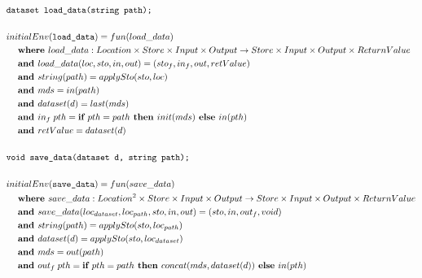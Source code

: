 \documentclass[12pt]{article}
\begin{document}
\begin{align*}
	&\texttt{dataset load\_data(string path);} \\
	\\
&initialEnv(\texttt{load\_data}) = fun(load\_data) \\
&\hspace{3ex}\textbf{where } load\_data:Location\times Store\times Input\times Output\rightarrow Store\times Input\times Output\times ReturnValue \\
&\hspace{3ex}\textbf{and } load\_data(loc,sto,in,out) = (sto_f,in_f,out, retValue)\\
&\hspace{3ex}\textbf{and } string(path) = applySto(sto,loc) \\
&\hspace{3ex}\textbf{and } mds = in(path) \\
&\hspace{3ex}\textbf{and } dataset(d) = last(mds) \\
&\hspace{3ex}\textbf{and } in_f\; pth = \textbf{if } pth = path \textbf{ then } init(mds)\textbf{ else } in(pth) \\
&\hspace{3ex}\textbf{and } retValue = dataset(d)\\
\\
	&\texttt{void save\_data(dataset d, string path);} \\
	\\
&initialEnv(\texttt{save\_data}) = fun(save\_data) \\
&\hspace{3ex}\textbf{where } save\_data:Location^2\times Store\times Input\times Output\rightarrow Store\times Input\times Output\times ReturnValue \\
&\hspace{3ex}\textbf{and } save\_data(loc_{dataset}, loc_{path},sto,in,out) = (sto,in,out_f, void)\\
&\hspace{3ex}\textbf{and } string(path) = applySto(sto,loc_{path}) \\
&\hspace{3ex}\textbf{and } dataset(d) = applySto(sto,loc_{dataset}) \\
&\hspace{3ex}\textbf{and } mds = out(path) \\
&\hspace{3ex}\textbf{and } out_f\; pth = \textbf{if } pth = path \textbf{ then } concat(mds, dataset(d))\textbf{ else } in(pth) \\
\end{align*}
\end{document}
